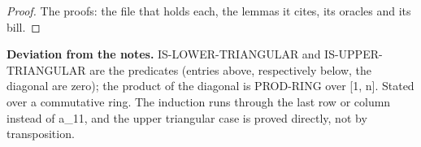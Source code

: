 %
\begin{proof}
%
The proofs: the file that holds each, the lemmas it cites, its oracles and its bill.
%
%
%
%
%
%
%
%
%
\end{proof}
%
\noindent\textbf{Deviation from the notes.} IS-LOWER-TRIANGULAR and IS-UPPER-TRIANGULAR are the predicates (entries above, respectively below, the diagonal are zero); the product of the diagonal is PROD-RING over [1, n]. Stated over a commutative ring. The induction runs through the last row or column instead of a\_11, and the upper triangular case is proved directly, not by transposition.
%
\renewcommand{\thethm}{3.25}
